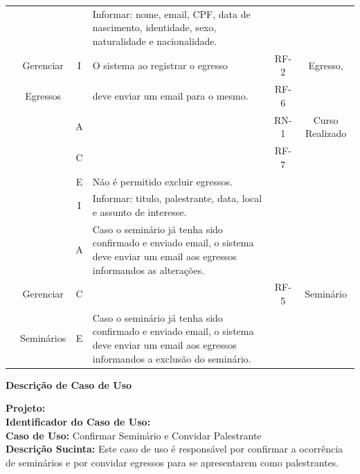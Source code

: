 \begin{table}[h]
\begin{tabular}{|c|c|c|p{6cm}|c|c|}
 		
 		
 		\rowcolor[rgb]{0.97,0.97,0.97}
 		{} & {} & {} & Informar: nome, email, CPF, data de nascimento, identidade, sexo, naturalidade e nacionalidade. & {} & {} \\ \rowcolor[rgb]{0.97,0.97,0.97} 
 		{} & Gerenciar  &  I  & O sistema ao registrar o egresso  &  RF-2  &  Egresso,   \\  \rowcolor[rgb]{0.97,0.97,0.97}
 		\UC\label{uc-egresso}  & Egressos  &  {}   &  deve enviar um email para o mesmo.  &  RF-6   &    {}     \\ \cline{3-4} \rowcolor[rgb]{0.97,0.97,0.97}
 		{}  &  {}   &  A  &   {}    &  RN-1 &    Curso Realizado   \\\cline{3-4} \rowcolor[rgb]{0.97,0.97,0.97}
 		{}  &  {}   &  C  &   {}    &   RF-7   &    {}   \\\cline{3-4} \rowcolor[rgb]{0.97,0.97,0.97}
 		{}  &  {}   &  E  &   Não é permitido excluir egressos.   &  {}   &  {}  \\ \hline \hline
 		
 		
 		
		{}  &  {}  &  I  &  Informar: titulo, palestrante, data, local e assunto de interesse.  &  {}  &  {}  \\ \cline{3-4}
 		{} & {}  &  A  &  Caso o seminário já tenha sido confirmado e enviado email, o sistema deve enviar um email aos egressos informandos as alterações. & {} & {} \\ \cline{3-4}
 		\UC\label{uc-seminario}   &  Gerenciar   &    C   &    {}     &  RF-5   &    Seminário   \\ \cline{3-4}
 		{}    &    Seminários   &  E  &  Caso o seminário já tenha sido confirmado e enviado email, o sistema deve enviar um email aos egressos informandos a exclusão do seminário.  &  {}   &  {}   \\ \hline 
 		 		
 		 		
	\end{tabular}
	\label{tabela-core-cadastrais}
\end{table}




\newpage
\begin{flushright}    \textbf{Descrição de Caso de Uso}   \end{flushright}         
\noindent  \textbf{Projeto:} \imprimirtitulo  \\ 
\textbf{Identificador do Caso de Uso:} \UC\label{uc-seminario} \\ 
\textbf{Caso de Uso:} Confirmar Seminário e Convidar Palestrante \\
\noindent \textbf{Descrição Sucinta:} Este caso de uso é responsável por confirmar a ocorrência de seminários e por convidar egressos para se apresentarem como palestrantes.\\

